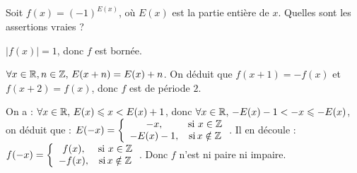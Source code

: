 \begin{question} 
Soit $f(x)= (-1)^{E(x)}$, où  $E(x)$ est la partie entière de $x$. Quelles sont les assertions vraies ?
\begin{answers}



\end{answers}
\begin{explanations}
$|f(x)|=1$, donc $f$ est bornée.

$\forall x \in \mathbb{R}, n\in \mathbb{Z}, \, E(x+n)= E(x)+n$. On déduit que  $f(x+1)=-f(x)$ et $f(x+2)=f(x)$, donc $f$ est de période $2$.

On a : $ \forall x \in \mathbb{R}, \, E(x)\leqslant x< E(x)+1$,  donc $\forall x \in \mathbb{R}, \, -E(x)-1< -x\leqslant - E(x)$, on déduit que : $E(-x)=\left\{\begin{array}{cc}-x,& \mbox{si} \, \, x \in \mathbb{Z} \\ -E(x)-1,& \mbox{si} \,  x \notin \mathbb{Z}  \end{array}\right.$. Il en découle :  $f(-x)=\left\{\begin{array}{cc}f(x),& \mbox{si} \, \, x \in \mathbb{Z} \\ -f(x),& \mbox{si} \,  x \notin \mathbb{Z}  \end{array}\right.$. Donc $f$ n'est ni paire ni impaire.
\end{explanations}

\end{question}


